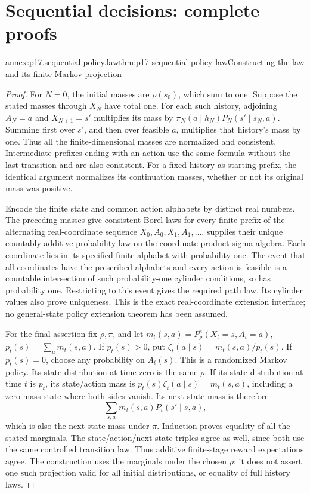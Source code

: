 \section{Sequential decisions: complete proofs}
\label{sec:annex-p17-sequential-decisions}

\begin{annexitem}{annex:p17.sequential.policy.law}{thm:p17-sequential-policy-law}{Constructing the law and its finite Markov projection}
\begin{proof}
For \(N=0\), the initial masses are \(\rho(s_0)\), which
sum to one. Suppose the stated masses through \(X_N\)
have total one. For each such history, adjoining
\(A_N=a\) and \(X_{N+1}=s'\) multiplies its mass by
\(\pi_N(a\mid h_N)P_N(s'\mid s_N,a)\).
Summing first over \(s'\), and then over feasible \(a\),
multiplies that history's mass by one. Thus all the
finite-dimensional masses are normalized and consistent.
Intermediate prefixes ending with an action use the same
formula without the last transition and are also consistent.
For a fixed history as starting prefix, the identical
argument normalizes its continuation masses, whether or
not its original mass was positive.

Encode the finite state and common action alphabets by
distinct real numbers. The preceding masses give consistent
Borel laws for every finite prefix of the alternating
real-coordinate sequence \(X_0,A_0,X_1,A_1,\ldots\).
 supplies their unique
countably additive probability law on the coordinate
product sigma algebra. Each coordinate lies in its
specified finite alphabet with probability one.
The event that all coordinates have the prescribed
alphabets and every action is feasible is a countable
intersection of such probability-one cylinder conditions,
so has probability one. Restricting to this event
gives the required path law. Its cylinder values also
prove uniqueness. This is the exact real-coordinate
extension interface; no general-state policy extension
theorem has been assumed.

For the final assertion fix \(\rho,\pi\), and let
\(m_t(s,a)=P_\rho^\pi(X_t=s,A_t=a)\),
\(p_t(s)=\sum_a m_t(s,a)\).
If \(p_t(s)>0\), put
\(\zeta_t(a\mid s)=m_t(s,a)/p_t(s)\).
If \(p_t(s)=0\), choose any probability on \(A_t(s)\).
This is a randomized Markov policy. Its state distribution
at time zero is the same \(\rho\).
If its state distribution at time \(t\) is \(p_t\),
its state/action mass is \(p_t(s)\zeta_t(a\mid s)=m_t(s,a)\),
including a zero-mass state where both sides vanish.
Its next-state mass is therefore
\[
                 \sum_{s,a}m_t(s,a)P_t(s'\mid s,a),
\]
which is also the next-state mass under \(\pi\).
Induction proves equality of all the stated marginals.
The state/action/next-state triples agree as well,
since both use the same controlled transition law.
Thus additive finite-stage reward expectations agree.
The construction uses the marginals under the chosen
\(\rho\); it does not assert one such projection valid
for all initial distributions, or equality of full
history laws.
\end{proof}
\end{annexitem}

